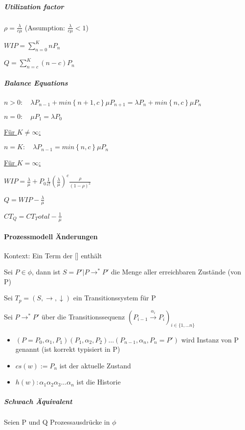 \documentclass[a4paper,12pt,smallheadings]{scrartcl}
\begin{document}
\subparagraph{Utilization factor} 
$\rho = \frac{\lambda}{c\mu}$ 
\quad (Assumption: $\frac{\lambda}{c\mu} < 1$)

$WIP = \sum_{n=0}^{K} n P_n$

$Q = \sum_{n=c}^{K} (n-c) P_n$

\subparagraph{Balance Equations} \hfill

$n > 0: \quad \lambda P_{n-1} + min\left\{n+1,c\right\}\mu P_{n+1} = \lambda P_n + min\left\{ n, c \right\} \mu P_n $

$n = 0: \quad \mu P_1 = \lambda P_0$

\hfill

\underline{Für $K \neq \infty$:}

$n = K: \quad \lambda P_{n-1} = min\left\{ n,c \right\} \mu P_{n} $

\hfill

\underline{Für $K = \infty$:}

$WIP = \frac{\lambda}{\mu} + P_0 \frac{1}{c!} \left(\frac{\lambda}{\mu}\right)^c \frac{\rho}{\left(1-\rho\right)^2}$

$Q = WIP - \frac{\lambda}{\mu}$

$CT_Q = CT_Total - \frac{1}{\mu}$

\paragraph{Prozessmodell Änderungen} 
Kontext: Ein Term der [] enthält

Sei $P \in \phi$, dann ist $S = {P' | P \rightarrow^* P'}$ die Menge aller erreichbaren Zustände (von P)

Sei $T_p = (S , \rightarrow, \downarrow)$ ein Transitionssystem für P

Sei $P \rightarrow^* P'$ über die Transitionssequenz $(P_{i-1} \overset{\alpha_i}{\rightarrow} P_i)_{i \in \{1, \dots n\}}$
\begin{itemize}
\item $(P = P_0, \alpha_1, P_1)(P_1, \alpha_2, P_2) \dots (P_{n-1}, \alpha_n, P_n = P')$ wird Instanz von P genannt (ist korrekt typisiert in P)
\item $cs(w) := P_n$ ist der aktuelle Zustand
\item $h(w): \alpha_1\alpha_2\alpha_3 \dots \alpha_n$ ist die Historie
\end{itemize}

\subparagraph{Schwach Äquivalent}

Seien P und Q Prozessausdrücke in $\phi$
\end{document}
